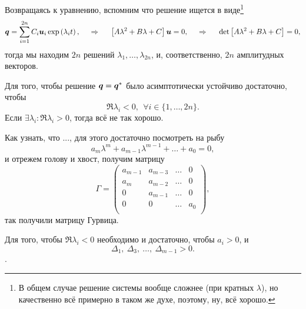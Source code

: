 Возвращаясь к уравнению, вспомним что решение ищется в виде\footnote{
    В общем случае решение системы вообще сложнее (при кратных $\lambda$), но качественно всё примерно в таком же духе, поэтому, ну, всё хорошо.
} 
\begin{equation*}
    \mbox{\boldmath $q$} = \sum_{i=1}^{2n} C_i \mbox{\boldmath $u$}_i \exp\left(
        \lambda_i t
    \right),
    \hspace{0.5cm} \Rightarrow \hspace{0.5cm}
    \left[
        A \lambda^2 + B \lambda + C
    \right] \mbox{\boldmath $u$} = 0,
    \hspace{0.5cm} \Rightarrow \hspace{0.5cm}
    \det\left[
        A \lambda^2 + B \lambda + C
    \right] = 0,
\end{equation*}
тогда мы находим $2n$ решений $\lambda_1, \ldots, \lambda_{2n}$, и, соответственно, $2n$ амплитудных векторов.


\begin{to_thr}
    Для того, чтобы решение $\mbox{\boldmath $q$} = \mbox{\boldmath $q$}^*$ было асимптотически устойчиво достаточно, чтобы
    \begin{equation*}
        \Re \lambda_i < 0, \ \ \forall i \in \{1, \ldots, 2n\}.
    \end{equation*}
    Если $\exists \lambda_i \colon \Re \lambda_i > 0$, тогда всё не так хорошо.
\end{to_thr}


Как узнать, что ..., для этого достаточно посмотреть на рыбу
\begin{equation*}
    a_m \lambda^m + a_{m-1} \lambda^{m-1} + \ldots + a_0 = 0,
\end{equation*}
и отрежем голову и хвост, получим матрицу
\begin{equation*}
    \Gamma = \begin{pmatrix}
        a_{m-1} & a_{m-3} & \ldots & 0\\
        a_m & a_{m-2} & \ldots & 0 \\ 
        0 & a_{m-1} & \ldots & 0 \\
        0 & 0 & \ldots & a_0 \\
    \end{pmatrix},
\end{equation*}
так получили матрицу Гурвица.

\begin{to_thr}
    Для того, чтобы $\Re \lambda_i < 0$ необходимо и достаточно, чтобы $a_i > 0$, и
    \begin{equation*}
        \Delta_1, \ \Delta_3, \ \ldots,\ \Delta_{m-1} > 0.
    \end{equation*}
    .
\end{to_thr}